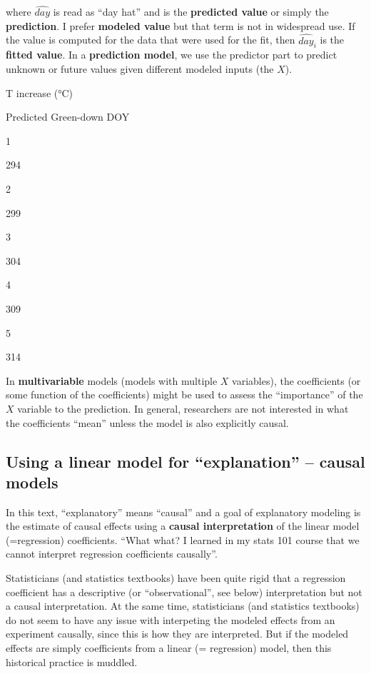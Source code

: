 \documentclass[]{book}
\begin{document}
where \(\widehat{day}\) is read as ``day hat'' and is the \textbf{predicted value} or simply the \textbf{prediction}. I prefer \textbf{modeled value} but that term is not in widespread use. If the value is computed for the data that were used for the fit, then \(\widehat{day}_i\) is the \textbf{fitted value}. In a \textbf{prediction model}, we use the predictor part to predict unknown or future values given different modeled inputs (the \(X\)).

T increase (°C)

Predicted Green-down DOY

1

294

2

299

3

304

4

309

5

314

In \textbf{multivariable} models (models with multiple \(X\) variables), the coefficients (or some function of the coefficients) might be used to assess the ``importance'' of the \(X\) variable to the prediction. In general, researchers are not interested in what the coefficients ``mean'' unless the model is also explicitly causal.

\hypertarget{using-a-linear-model-for-explanation-causal-models}{%
\subsection{Using a linear model for ``explanation'' -- causal models}\label{using-a-linear-model-for-explanation-causal-models}}

In this text, ``explanatory'' means ``causal'' and a goal of explanatory modeling is the estimate of causal effects using a \textbf{causal interpretation} of the linear model (=regression) coefficients. ``What what? I learned in my stats 101 course that we cannot interpret regression coefficients causally''.

Statisticians (and statistics textbooks) have been quite rigid that a regression coefficient has a descriptive (or ``observational'', see below) interpretation but not a causal interpretation. At the same time, statisticians (and statistics textbooks) do not seem to have any issue with interpeting the modeled effects from an experiment causally, since this is how they are interpreted. But if the modeled effects are simply coefficients from a linear (= regression) model, then this historical practice is muddled.
\end{document}
